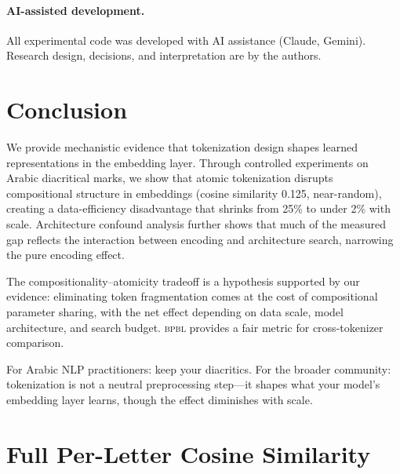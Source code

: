 \documentclass[11pt]{article}
\newcommand{\bpbl}{\textsc{bpbl}}
\begin{document}
\paragraph{AI-assisted development.}
All experimental code was developed with AI assistance (Claude, Gemini).
Research design, decisions, and interpretation are by the authors.

\section{Conclusion}

We provide mechanistic evidence that tokenization design shapes learned representations in the embedding layer.
Through controlled experiments on Arabic diacritical marks, we show that atomic tokenization disrupts compositional structure in embeddings (cosine similarity 0.125, near-random), creating a data-efficiency disadvantage that shrinks from 25\% to under 2\% with scale.
Architecture confound analysis further shows that much of the measured gap reflects the interaction between encoding and architecture search, narrowing the pure encoding effect.

The compositionality--atomicity tradeoff is a hypothesis supported by our evidence: eliminating token fragmentation comes at the cost of compositional parameter sharing, with the net effect depending on data scale, model architecture, and search budget.
\bpbl{} provides a fair metric for cross-tokenizer comparison.

For Arabic NLP practitioners: keep your diacritics.
For the broader community: tokenization is not a neutral preprocessing step---it shapes what your model's embedding layer learns, though the effect diminishes with scale.





\appendix

\section{Full Per-Letter Cosine Similarity}
\label{app:per_letter}
\end{document}
